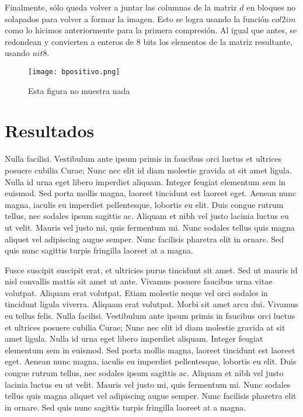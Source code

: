 \documentclass[twocolumn,a4paper,10pt]{article}
\begin{document}
Finalmente, s\'olo queda volver a juntar las columnas de la matriz $d$ en bloques no solapados para volver a formar la imagen. Esto se logra usando la funci\'on 
$col2im$ como lo hicimos anteriormente para la primera compresi\'on. Al igual que antes, se redondean y convierten a enteros de 8 bits los elementos de la matriz
resultante, usando $uit8$.\\

\begin{figure}
    \center \texttt{[image: bpositivo.png]}
    \caption{Esta figura no muestra nada}
\end{figure}

\section{Resultados}
Nulla facilisi. Vestibulum ante ipsum primis in faucibus orci luctus et ultrices posuere cubilia Curae; Nunc nec elit id diam molestie gravida at sit amet ligula. Nulla id urna eget libero imperdiet aliquam. Integer feugiat elementum sem in euismod. Sed porta mollis magna, laoreet tincidunt est laoreet eget. Aenean nunc magna, iaculis eu imperdiet pellentesque, lobortis eu elit. Duis congue rutrum tellus, nec sodales ipsum sagittis ac. Aliquam et nibh vel justo lacinia luctus eu ut velit. Mauris vel justo mi, quis fermentum mi. Nunc sodales tellus quis magna aliquet vel adipiscing augue semper. Nunc facilisis pharetra elit in ornare. Sed quis nunc sagittis turpis fringilla laoreet at a magna.

Fusce suscipit suscipit erat, et ultricies purus tincidunt sit amet. Sed ut mauris id nisl convallis mattis sit amet ut ante. Vivamus posuere faucibus urna vitae volutpat. Aliquam erat volutpat. Etiam molestie neque vel orci sodales in tincidunt ligula viverra. Aliquam erat volutpat. Morbi sit amet arcu dui. Vivamus eu tellus felis.
Nulla facilisi. Vestibulum ante ipsum primis in faucibus orci luctus et ultrices posuere cubilia Curae; Nunc nec elit id diam molestie gravida at sit amet ligula. Nulla id urna eget libero imperdiet aliquam. Integer feugiat elementum sem in euismod. Sed porta mollis magna, laoreet tincidunt est laoreet eget. Aenean nunc magna, iaculis eu imperdiet pellentesque, lobortis eu elit. Duis congue rutrum tellus, nec sodales ipsum sagittis ac. Aliquam et nibh vel justo lacinia luctus eu ut velit. Mauris vel justo mi, quis fermentum mi. Nunc sodales tellus quis magna aliquet vel adipiscing augue semper. Nunc facilisis pharetra elit in ornare. Sed quis nunc sagittis turpis fringilla laoreet at a magna.
\end{document}
